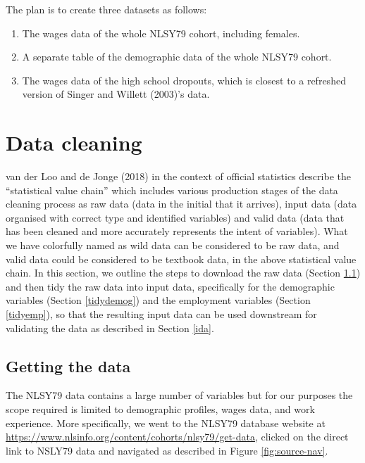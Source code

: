 \documentclass{article}
\begin{document}
The plan is to create three datasets as follows:

\begin{enumerate}
\def\labelenumi{\arabic{enumi}.}
\tightlist
\item
  The wages data of the whole NLSY79 cohort, including females.
\item
  A separate table of the demographic data of the whole NLSY79 cohort.
\item
  The wages data of the high school dropouts, which is closest to a refreshed version of Singer and Willett (2003)'s data.
\end{enumerate}

\hypertarget{cleaning}{%
\section{Data cleaning}\label{cleaning}}

van der Loo and de Jonge (2018) in the context of official statistics describe the ``statistical value chain'' which includes various production stages of the data cleaning process as raw data (data in the initial that it arrives), input data (data organised with correct type and identified variables) and valid data (data that has been cleaned and more accurately represents the intent of variables). What we have colorfully named as wild data can be considered to be raw data, and valid data could be considered to be textbook data, in the above statistical value chain. In this section, we outline the steps to download the raw data (Section \ref{getdata}) and then tidy the raw data into input data, specifically for the demographic variables (Section \ref{tidydemog}) and the employment variables (Section \ref{tidyemp}), so that the resulting input data can be used downstream for validating the data as described in Section \ref{ida}.

\hypertarget{getdata}{%
\subsection{Getting the data}\label{getdata}}

The NLSY79 data contains a large number of variables but for our purposes the scope required is limited to demographic profiles, wages data, and work experience. More specifically, we went to the NLSY79 database website at \url{https://www.nlsinfo.org/content/cohorts/nlsy79/get-data}, clicked on the direct link to NSLY79 data and navigated as described in Figure \ref{fig:source-nav}.
\end{document}
